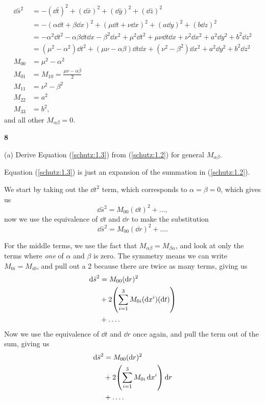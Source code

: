 \documentclass[gr-notes.tex]{subfiles}
\begin{document}
\begin{align*}
  \dd{\bar{s}}^2 &=
  -(\dd{\bar{t}})^2 + (\dd{\bar{x}})^2 + (\dd{\bar{y}})^2 + (\dd{\bar{z}})^2
  \\ &=
  -(\alpha \dd{t} + \beta \dd{x})^2
  +(\mu \dd{t} + \nu \dd{x})^2
  +(a \dd{y})^2
  +(b \dd{z})^2
  \\ &=
  -\alpha^2 \dd{t}^2 -
  \alpha\beta \dd{t} \dd{x} -
  \beta^2 \dd{x}^2 +
  \mu^2 \dd{t}^2 +
  \mu \nu \dd{t} \dd{x} +
  \nu^2 \dd{x}^2 +
  a^2 \dd{y}^2 +
  b^2 \dd{z}^2
  \\ &=
  (\mu^2 - \alpha^2) \dd{t}^2 +
  (\mu \nu - \alpha \beta) \dd{t} \dd{x} +
  (\nu^2 - \beta^2) \dd{x}^2 +
  a^2 \dd{y}^2 +
  b^2 \dd{z}^2
  \\
  M_{00} &= \mu^2 - \alpha^2
  \\
  M_{01} &= M_{10} = \frac{\mu \nu - \alpha \beta}{2}
  \\
  M_{11} &= \nu^2 - \beta^2
  \\
  M_{22} &= a^2
  \\
  M_{33} &= b^2,
\end{align*}
and all other $M_{\alpha\beta} = 0$.


\textbf{8}

(a) Derive Equation (\ref{schutz:1.3}) from (\ref{schutz:1.2}) for general $M_{\alpha\beta}$.

Equation (\ref{schutz:1.3}) is just an expansion of the summation in (\ref{schutz:1.2}).

We start by taking out the $\dd{t}^2$ term, which corresponds to $\alpha = \beta = 0$, which gives us
%
\begin{displaymath}
  \dd{\bar{s}}^2 = M_{00} (\dd{t})^2 + \ldots,
\end{displaymath}
%
now we use the equivalence of $\dd{t}$ and $\dd{r}$ to make the substitution
%
\begin{displaymath}
  \dd{\bar{s}}^2 = M_{00} (\dd{r})^2 + \ldots.
\end{displaymath}

For the middle terms, we use the fact that $M_{\alpha\beta} = M_{\beta\alpha}$, and look at only the terms where \emph{one} of $\alpha$ and $\beta$ is zero. The symmetry means we can write $M_{0i} = M_{i0}$, and pull out a 2 because there are twice as many terms, giving us
%
\begin{align*}
  \dd{\bar{s}}^2 &=
  M_{00} (\dd{r})^2
  \\ &+
  2 \qty( \sum_{i=1}^3 M_{0i} (\dd{x^i}) (\dd{t}) )
  \\ &+
  \ldots.
\end{align*}
%
Now we use the equivalence of $\dd{t}$ and $\dd{r}$ once again, and pull the term out of the sum, giving us
%
\begin{align*}
  \dd{\bar{s}}^2 &=
  M_{00} (\dd{r})^2
  \\ &+
  2 \qty( \sum_{i=1}^3 M_{0i} \dd{x^i} ) \dd{r}
  \\ &+
  \ldots.
\end{align*}
\end{document}
